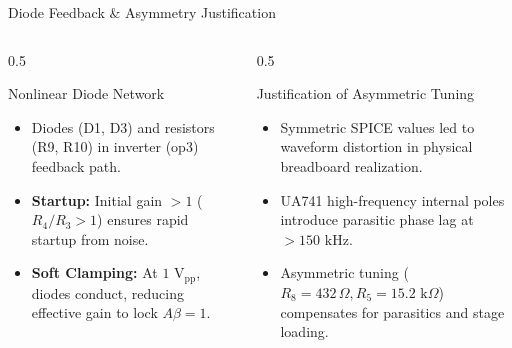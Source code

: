 \documentclass{beamer}
\begin{document}
\begin{frame}{Diode Feedback \& Asymmetry Justification}
  \begin{columns}
    \begin{column}{0.5\textwidth}
      \begin{block}{Nonlinear Diode Network}
        \begin{itemize}
          \item Diodes (D1, D3) and resistors (R9, R10) in inverter (op3) feedback path.
          \item \textbf{Startup:} Initial gain $> 1$ ($R_4/R_3 > 1$) ensures rapid startup from noise.
          \item \textbf{Soft Clamping:} At $1\text{ V}_{\text{pp}}$, diodes conduct, reducing effective gain to lock $A\beta = 1$.
        \end{itemize}
      \end{block}
    \end{column}
    \begin{column}{0.5\textwidth}
      \begin{block}{Justification of Asymmetric Tuning}
        \begin{itemize}
          \item Symmetric SPICE values led to waveform distortion in physical breadboard realization.
          \item UA741 high-frequency internal poles introduce parasitic phase lag at $>150\text{ kHz}$.
          \item Asymmetric tuning ($R_8 = 432\,\Omega, R_5 = 15.2\text{ k}\Omega$) compensates for parasitics and stage loading.
        \end{itemize}
      \end{block}
    \end{column}
  \end{columns}
\end{frame}
\end{document}
